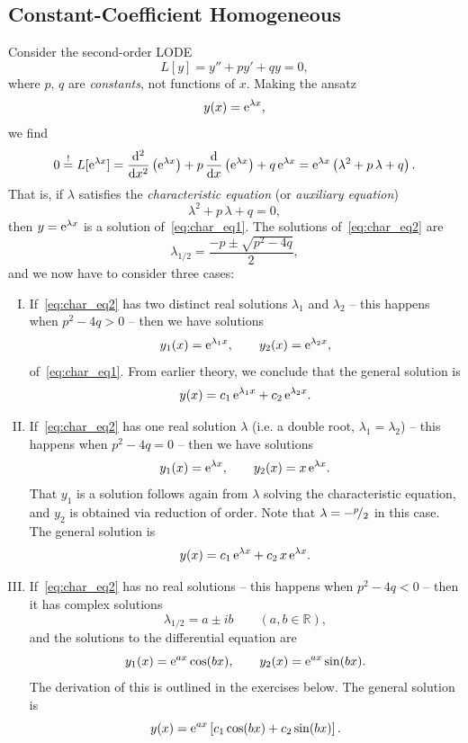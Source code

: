 \subsection{Constant-Coefficient Homogeneous}
\label{sec:cch}

\begin{remark} Consider the second-order LODE
\label{rem:cch}
	\begin{equation}
	\label{eq:char_eq1}
		L[y] = y''+py'+qy = 0,
	\end{equation} 
	where $p,\,q$ are \emph{constants}, not functions of $x$. Making the ansatz
	\[ y(x) = \mathrm{e}^{\lambda x}, \]
	we find
	\[	0  \stackrel{!}{=} L[\mathrm{e}^{\lambda x}]
	= \displaystyle{\frac{\mathrm{d}^2 }{\mathrm{d}x^2}} \left( \mathrm{e}^{\lambda x} \right) +
	p\,\displaystyle{\frac{\mathrm{d}}{\mathrm{d}x}} \left( \mathrm{e}^{\lambda x} \right) + q\,\mathrm{e}^{\lambda x} 
	= \mathrm{e}^{\lambda x}\left(\lambda^2+p\,\lambda+q\right). \]
	That is, if $\lambda$ satisfies the \emph{characteristic equation} (or \emph{auxiliary equation})
	\begin{equation}
	\label{eq:char_eq2}
		\lambda^2+p\,\lambda+q = 0,
	\end{equation}
	then $y=\mathrm{e}^{\lambda x}$ is a solution of~\eqref{eq:char_eq1}. The solutions of~\eqref{eq:char_eq2} are
	\[ \lambda_{1/2} = \frac{-p\pm\sqrt{p^2-4q}}{2}, \]
	and we now have to consider three cases:
	\begin{enumerate}[(I)]
		\item If~\eqref{eq:char_eq2} has two distinct real solutions $\lambda_1$ and $\lambda_2$ -- this happens when $p^2-4q>0$ -- then we have solutions
		\[ y_1(x) = \mathrm{e}^{\lambda_1 x}, \qquad y_2(x) = \mathrm{e}^{\lambda_2 x}, \]
		of~\eqref{eq:char_eq1}. From earlier theory, we conclude that the general solution is
		\[ y(x) = c_1\,\mathrm{e}^{\lambda_1 x} + c_2\,\mathrm{e}^{\lambda_2 x}.\]
		\item If~\eqref{eq:char_eq2} has one real solution $\lambda$ (i.e. a double root, $\lambda_1=\lambda_2$) -- this happens when $p^2-4q=0$ -- then we have solutions
		\[ y_1(x) = \mathrm{e}^{\lambda x}, \qquad y_2(x) = x\,\mathrm{e}^{\lambda x}. \]
		That $y_1$ is a solution follows again from $\lambda$ solving the characteristic equation, and $y_2$ is obtained via reduction of order. Note that $\lambda=-{}^{p}\!/_{2}$ in this case. The general solution is
 		\[ y(x) = c_1\,\mathrm{e}^{\lambda x} + c_2\,x\,\mathrm{e}^{\lambda x}. \]
		\item If~\eqref{eq:char_eq2} has no real solutions -- this happens when $p^2-4q<0$ -- then it has complex solutions 
		\[ \lambda_{1/2} = a \pm ib \qquad (a,b\in\mathbb{R}), \]
		and the solutions to the differential equation are
		\[ y_1(x) = \mathrm{e}^{ax}\cos(bx), \qquad y_2(x) = \mathrm{e}^{ax}\sin(bx). \]
		The derivation of this is outlined in the exercises below. The general solution is
		\[ y(x) = \mathrm{e}^{ax}\left[ c_1\cos(bx)+c_2\sin(bx) \right]. \]
\end{enumerate}
\end{remark}

